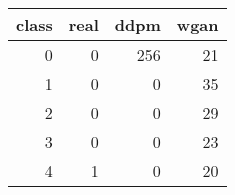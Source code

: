 \begin{tabular}{rrrr}
\toprule
class & real & ddpm & wgan \\
\midrule
0 & 0 & 256 & 21 \\
1 & 0 & 0 & 35 \\
2 & 0 & 0 & 29 \\
3 & 0 & 0 & 23 \\
4 & 1 & 0 & 20 \\
\bottomrule
\end{tabular}
